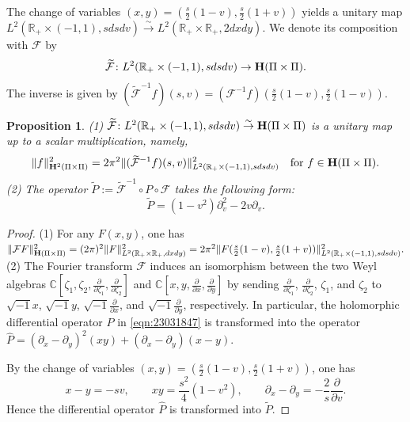 \documentclass[12pt,leqno]{amsart}
\theoremstyle{plain}
\newtheorem{proposition}[thm]{Proposition}
\theoremstyle{definition}
\begin{document}
The change of variables $(x,y)=(\frac s 2(1-v), \frac s 2(1+v))$
 yields a unitary map
$
  L^2({\mathbb{R}}_+ \times (-1,1), s d s d v)
  \overset \sim \longrightarrow
  L^2({\mathbb{R}}_+ \times {\mathbb{R}}_+, 2 d x d y).
$
We denote its composition with ${\mathcal{F}}$ by 
\[
   \widetilde{\mathcal{F}} \colon L^2({\mathbb{R}}_+ \times (-1,1), s d s d v)
\to {\bf{H}}(\Pi \times \Pi).  
\]
The inverse is given by
 $(\widetilde{\mathcal{F}}^{-1}f)(s,v)
 =({\mathcal{F}}^{-1}f)(\frac s 2(1-v), \frac s 2(1-v))$.  



\begin{proposition}
\label{prop:Ftilde}
{\rm{(1)}}\enspace
$
  \widetilde{\mathcal{F}} \colon 
  L^2({\mathbb{R}}_+ \times (-1,1), s d s d v)
  \overset \sim \rightarrow
{\bf{H}}(\Pi \times \Pi)
$
is a unitary map
 up to a scalar multiplication, 
 namely, 
\[
  \|f\|_{{\bf{H}}^2(\Pi \times \Pi)}^2
  =
2\pi^2 \|(\widetilde{\mathcal{F}}^{-1} f)(s,v)\|_{ L^2({\mathbb{R}}_+ \times (-1,1), s d s d v)}^2
\quad
\text{for $f \in {\bf{H}}(\Pi \times \Pi)$}.
\]
\newline
{\rm{(2)}}\enspace
The operator $\widetilde P:= \widetilde {\mathcal{F}}^{-1} \circ P \circ {\mathcal{F}}$ takes the following form:
\begin{equation}
\label{eqn:Ptilde}
  \widetilde P=(1-v^2) \partial_v^2 -2v \partial_v.  
\end{equation}
\end{proposition}

\begin{proof}
(1)\enspace
For any $F(x,y)$, 
 one has 
$
  \|{\mathcal{F}} F\|_{{\bf{H}}(\Pi \times \Pi)}^2
  =
  (2 \pi)^2 \|F\|_{L^2({\mathbb{R}}_+ \times {\mathbb{R}}_+, d x d y)}^2
  =
  2 \pi^2 \|F(\frac s 2 (1-v), \frac s 2 (1+v))\|_{L^2({\mathbb{R}}_+ \times (-1,1), s d s d v)}^2.  
$
\newline
(2)\enspace
The Fourier transform ${\mathcal{F}}$ induces
 an isomorphism
 between the two Weyl algebras 
 ${\mathbb{C}}[\zeta_1, \zeta_2, \frac{\partial}{\partial \zeta_1}, \frac{\partial}{\partial \zeta_2}]$ and ${\mathbb{C}}[x, y, \frac{\partial}{\partial x}, \frac{\partial}{\partial y}]$
 by sending 
 $\frac{\partial}{\partial \zeta_1}$, $\frac{\partial}{\partial \zeta_2}$, 
 $\zeta_1$, and $\zeta_2$
 to $\sqrt{-1}x$, $\sqrt{-1}y$, 
 $\sqrt{-1}\frac{\partial}{\partial x}$, 
 and $\sqrt{-1}\frac{\partial}{\partial y}$, 
 respectively.  
In particular, 
 the holomorphic differential operator $P$
 in \eqref{eqn:23031847}
 is transformed
 into the operator 
$\widehat P
=(\partial_x-\partial_y)^2(x y)+(\partial_x-\partial_y)(x - y).  
$


By the change of variables $(x,y)=(\frac s 2(1-v), \frac s 2(1+v))$, 
 one has 
\[
  x-y=-s v, 
\qquad
 x y=\frac{s^2} 4(1-v^2), 
\qquad
  \partial_x - \partial_y = -\frac 2 s \frac{\partial}{\partial v}.  
\]
Hence the differential operator $\widehat P$ is transformed into $\widetilde P$. 
\end{proof}
\end{document}
